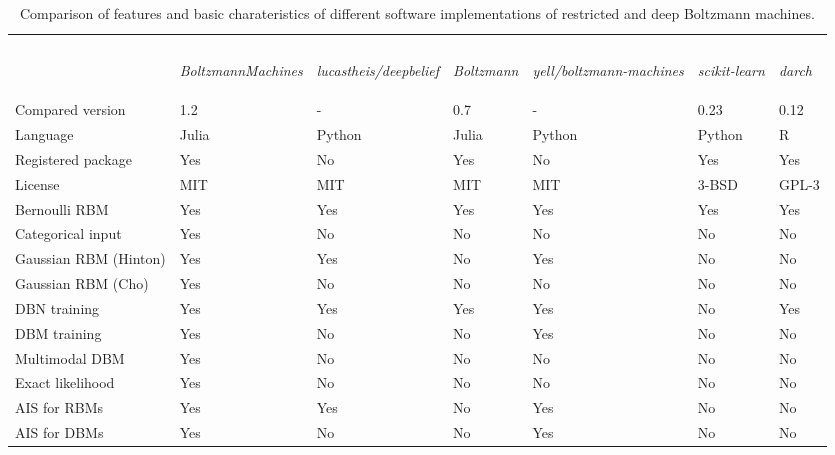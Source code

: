 \documentclass[12pt]{article}
\newcommand{\apkg}[1]{\emph{#1}}
\begin{document}
\begin{table}[h!]
\centering
\begin{tabular}{p{4.4cm} p{1.1cm} p{1.1cm} p{1.1cm} p{1.1cm} p{1.25cm} p{1.25cm}}
\hline \\ [3.9ex]\\
 & \begin{rotate}{25}\apkg{BoltzmannMachines} \end{rotate} & 
 \begin{rotate}{25} \apkg{lucastheis/deepbelief} \end{rotate} & 
 \begin{rotate}{25} \apkg{Boltzmann} \end{rotate} & 
 \begin{rotate}{25} \apkg{yell/boltzmann-machines}  \end{rotate} &
 \begin{rotate}{25} \apkg{scikit-learn} \end{rotate} &
 \begin{rotate}{25} \apkg{darch} \end{rotate} \\
\hline
Compared version & 1.2 & - & 0.7 & - & 0.23 & 0.12 \\
Language & Julia & Python & Julia & Python & Python & R \\
Registered package & Yes & No & Yes & No & Yes & Yes \\ 
License & MIT & MIT & MIT & MIT & 3-BSD & GPL-3 \\ 
Bernoulli RBM & Yes & Yes & Yes  & Yes & Yes & Yes \\
Categorical input & Yes & No & No & No & No & No \\
Gaussian RBM (Hinton) & Yes & Yes & No & Yes & No & No \\
Gaussian RBM (Cho) & Yes & No & No & No & No & No \\
DBN training & Yes & Yes & Yes & Yes & No & Yes \\
DBM training & Yes & No & No & Yes & No & No \\
Multimodal DBM & Yes & No & No & No & No & No \\
Exact likelihood & Yes & No & No & No & No & No \\
AIS for RBMs & Yes & Yes & No & Yes & No & No \\
AIS for DBMs & Yes & No & No & Yes & No & No \\
\hline
\end{tabular}
\caption{\label{tab:FeatureOverviewBoltzmann} Comparison of features and basic charateristics of different software implementations of restricted and deep Boltzmann machines.}
\end{table}
\end{document}
